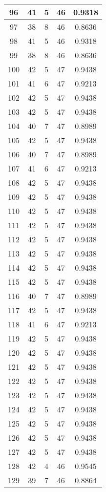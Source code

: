 \documentclass[letterpaper, 12pt]{article}
\begin{document}
\begin{longtable}{|c|c|c|c|c|}
\hline
96 & 41 & 5 & 46 & 0.9318 \\
\hline
97 & 38 & 8 & 46 & 0.8636 \\
\hline
98 & 41 & 5 & 46 & 0.9318 \\
\hline
99 & 38 & 8 & 46 & 0.8636 \\
\hline
100 & 42 & 5 & 47 & 0.9438 \\
\hline
101 & 41 & 6 & 47 & 0.9213 \\
\hline
102 & 42 & 5 & 47 & 0.9438 \\
\hline
103 & 42 & 5 & 47 & 0.9438 \\
\hline
104 & 40 & 7 & 47 & 0.8989 \\
\hline
105 & 42 & 5 & 47 & 0.9438 \\
\hline
106 & 40 & 7 & 47 & 0.8989 \\
\hline
107 & 41 & 6 & 47 & 0.9213 \\
\hline
108 & 42 & 5 & 47 & 0.9438 \\
\hline
109 & 42 & 5 & 47 & 0.9438 \\
\hline
110 & 42 & 5 & 47 & 0.9438 \\
\hline
111 & 42 & 5 & 47 & 0.9438 \\
\hline
112 & 42 & 5 & 47 & 0.9438 \\
\hline
113 & 42 & 5 & 47 & 0.9438 \\
\hline
114 & 42 & 5 & 47 & 0.9438 \\
\hline
115 & 42 & 5 & 47 & 0.9438 \\
\hline
116 & 40 & 7 & 47 & 0.8989 \\
\hline
117 & 42 & 5 & 47 & 0.9438 \\
\hline
118 & 41 & 6 & 47 & 0.9213 \\
\hline
119 & 42 & 5 & 47 & 0.9438 \\
\hline
120 & 42 & 5 & 47 & 0.9438 \\
\hline
121 & 42 & 5 & 47 & 0.9438 \\
\hline
122 & 42 & 5 & 47 & 0.9438 \\
\hline
123 & 42 & 5 & 47 & 0.9438 \\
\hline
124 & 42 & 5 & 47 & 0.9438 \\
\hline
125 & 42 & 5 & 47 & 0.9438 \\
\hline
126 & 42 & 5 & 47 & 0.9438 \\
\hline
127 & 42 & 5 & 47 & 0.9438 \\
\hline
128 & 42 & 4 & 46 & 0.9545 \\
\hline
129 & 39 & 7 & 46 & 0.8864 \\

\end{longtable}
\end{document}
